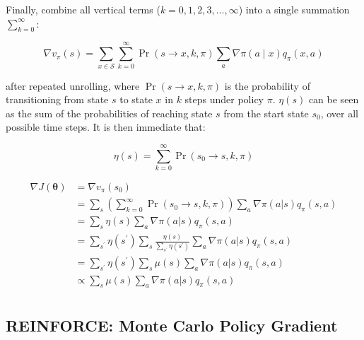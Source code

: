 \documentclass{article}
\begin{document}
Finally, combine all vertical terms ($k = 0, 1, 2, 3, \dots, \infty$) into a single summation $\sum_{k=0}^{\infty}$:

\begin{equation*}
\nabla v_{\pi}(s) = \sum_{x \in \mathcal{S}} \sum_{k=0}^{\infty} \operatorname{Pr}(s \to x, k, \pi) \sum_{a} \nabla \pi(a \mid x) q_{\pi}(x, a)
\end{equation*}

after repeated unrolling, where $\operatorname* { P r } ( s   \rightarrow   x , k , \pi )$ is the probability of transitioning from state $s$ to state $x$ in $k$ steps under policy $\pi$. $\eta (s)$ can be seen as the sum of the probabilities of reaching state $s$ from the start state $s_0$, over all possible time steps. It is then immediate that:

$$
\eta (s)=\sum _{k=0}^{\infty }\>\mathrm{Pr}\>(s_{0}\rightarrow s,k,\pi)
$$

$$
\begin{aligned} { \nabla J ( \pmb { \theta } ) } & { { } = \nabla v _ { \pi } ( s _ { 0 } ) } \\ { } & { { } = \sum _ { s } \left( \sum _ { k = 0 } ^ { \infty } \operatorname* { P r } ( s _ { 0 } { \to } s , k , \pi ) \right) \sum _ { a } \nabla \pi ( a | s ) q _ { \pi } ( s , a ) } \\ { } & { { } = \sum _ { s } \eta ( s ) \sum _ { a } \nabla \pi ( a | s ) q _ { \pi } ( s , a ) } \\ { } & { { } = \sum _ { s ^ { \prime } } \eta ( s ^ { \prime } ) \sum _ { s } \frac { \eta ( s ) } { \sum _ { s ^ { \prime } } \eta ( s ^ { \prime } ) } \sum _ { a } \nabla \pi ( a | s ) q _ { \pi } ( s , a ) } \\ { } & { { } = \sum _ { s ^ { \prime } } \eta ( s ^ { \prime } ) \sum _ { s } \mu ( s ) \sum _ { a } \nabla \pi ( a | s ) q _ { \pi } ( s , a ) } \\ { } & { { } \propto \sum _ { s } \mu ( s ) \sum _ { a } \nabla \pi ( a | s ) q _ { \pi } ( s , a ) } \\ \end{aligned}
$$

\subsection{REINFORCE: Monte Carlo Policy Gradient}
\end{document}
